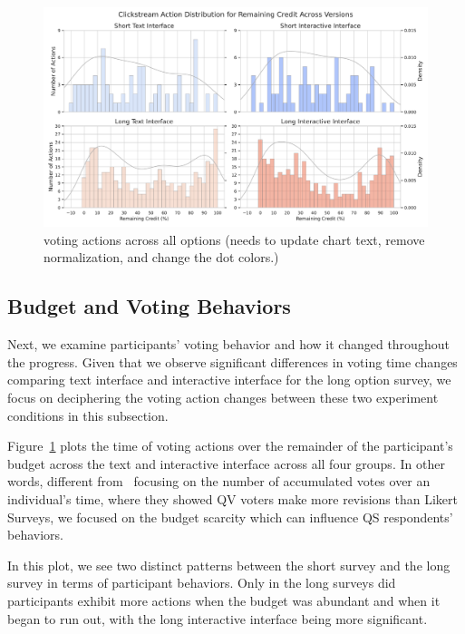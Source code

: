 \begin{figure}[ht]
    \centering
    \includegraphics[width=\textwidth]{content/image/results/clickstream_action_distribution.pdf}
    \caption{voting actions across all options (needs to update chart text, remove normalization, and change the dot colors.)}
    \label{fig:voting_all}
\end{figure}

\subsection{Budget and Voting Behaviors}
Next, we examine participants' voting behavior and how it changed throughout the progress. Given that we observe significant differences in voting time changes comparing text interface and interactive interface for the long option survey, we focus on deciphering the voting action changes between these two experiment conditions in this subsection.

Figure~\ref{fig:voting_all} plots the time of voting actions over the remainder of the participant's budget across the text and interactive interface across all four groups. In other words, different from~\textcite{quarfoot2017quadratic} focusing on the number of accumulated votes over an individual's time, where they showed QV voters make more revisions than Likert Surveys, we focused on the budget scarcity which can influence QS respondents' behaviors.

In this plot, we see two distinct patterns between the short survey and the long survey in terms of participant behaviors. Only in the long surveys did participants exhibit more actions when the budget was abundant and when it began to run out, with the long interactive interface being more significant.

